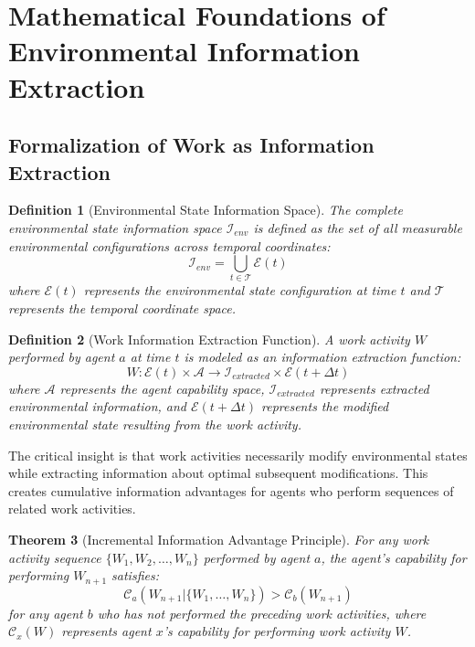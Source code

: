 \documentclass[12pt,a4paper]{article}
\newtheorem{theorem}{Theorem}
\newtheorem{definition}[theorem]{Definition}
\begin{document}
\section{Mathematical Foundations of Environmental Information Extraction}

\subsection{Formalization of Work as Information Extraction}

\begin{definition}[Environmental State Information Space]
The complete environmental state information space $\mathcal{I}_{env}$ is defined as the set of all measurable environmental configurations across temporal coordinates:
\begin{equation}
\mathcal{I}_{env} = \bigcup_{t \in \mathcal{T}} \mathcal{E}(t)
\end{equation}
where $\mathcal{E}(t)$ represents the environmental state configuration at time $t$ and $\mathcal{T}$ represents the temporal coordinate space.
\end{definition}

\begin{definition}[Work Information Extraction Function]
A work activity $W$ performed by agent $a$ at time $t$ is modeled as an information extraction function:
\begin{equation}
W: \mathcal{E}(t) \times \mathcal{A} \to \mathcal{I}_{extracted} \times \mathcal{E}(t+\Delta t)
\end{equation}
where $\mathcal{A}$ represents the agent capability space, $\mathcal{I}_{extracted}$ represents extracted environmental information, and $\mathcal{E}(t+\Delta t)$ represents the modified environmental state resulting from the work activity.
\end{definition}

The critical insight is that work activities necessarily modify environmental states while extracting information about optimal subsequent modifications. This creates cumulative information advantages for agents who perform sequences of related work activities.

\begin{theorem}[Incremental Information Advantage Principle]
For any work activity sequence $\{W_1, W_2, \ldots, W_n\}$ performed by agent $a$, the agent's capability for performing $W_{n+1}$ satisfies:
\begin{equation}
\mathcal{C}_a(W_{n+1} | \{W_1, \ldots, W_n\}) > \mathcal{C}_b(W_{n+1})
\end{equation}
for any agent $b$ who has not performed the preceding work activities, where $\mathcal{C}_x(W)$ represents agent $x$'s capability for performing work activity $W$.
\end{theorem}
\end{document}
